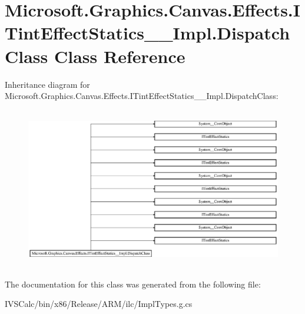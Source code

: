 \hypertarget{class_microsoft_1_1_graphics_1_1_canvas_1_1_effects_1_1_i_tint_effect_statics_____impl_1_1_dispatch_class}{}\section{Microsoft.\+Graphics.\+Canvas.\+Effects.\+I\+Tint\+Effect\+Statics\+\_\+\+\_\+\+Impl.\+Dispatch\+Class Class Reference}
\label{class_microsoft_1_1_graphics_1_1_canvas_1_1_effects_1_1_i_tint_effect_statics_____impl_1_1_dispatch_class}
Inheritance diagram for Microsoft.\+Graphics.\+Canvas.\+Effects.\+I\+Tint\+Effect\+Statics\+\_\+\+\_\+\+Impl.\+Dispatch\+Class\+:\begin{figure}[H]
\begin{center}
\leavevmode
\includegraphics[height=7.080460cm]{class_microsoft_1_1_graphics_1_1_canvas_1_1_effects_1_1_i_tint_effect_statics_____impl_1_1_dispatch_class}
\end{center}
\end{figure}


The documentation for this class was generated from the following file\+:\begin{DoxyCompactItemize}
\item 
I\+V\+S\+Calc/bin/x86/\+Release/\+A\+R\+M/ilc/Impl\+Types.\+g.\+cs\end{DoxyCompactItemize}
